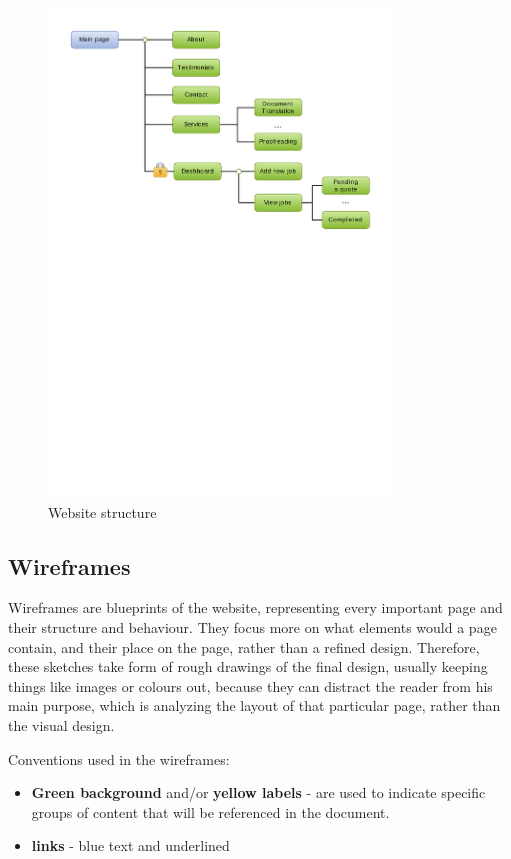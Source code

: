 \documentclass{l3proj}
\begin{document}
\begin{figure}[h]
\centering
\includegraphics[height=490px]{website-structure}
\caption{Website structure}
\label{website-structure}
\end{figure}

\newpage
\subsection{Wireframes}
% 
% 
Wireframes are blueprints of the website, representing every important page and 
their structure and behaviour.
They focus more on what elements would a page contain, and their place on
the page, rather than a refined design. Therefore, these sketches take form of
rough drawings of the final design, usually keeping things like images or
colours out, because they can distract the reader from his main purpose, which
is analyzing the layout of that particular page, rather than the visual design.


Conventions used in the wireframes:
\begin{itemize} \itemsep1pt \parskip0pt 
	\item \textbf{Green background} and/or \textbf{yellow labels} - are used to
	indicate specific groups of content that will be referenced in the document.
	\item \textbf{links} - blue text and underlined
\end{itemize}
\end{document}
